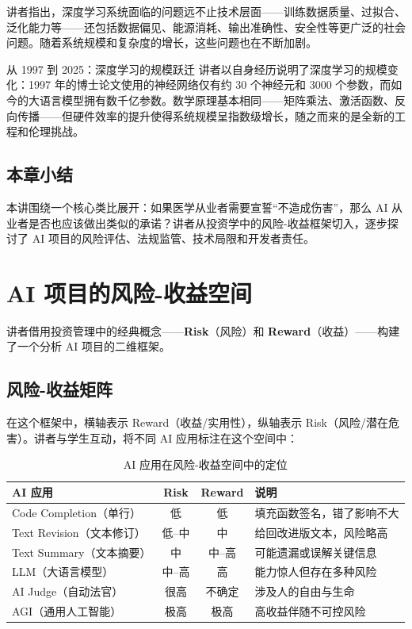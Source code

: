 \documentclass[a4paper]{article}
\begin{document}
讲者指出，深度学习系统面临的问题远不止技术层面——训练数据质量、过拟合、泛化能力等——还包括数据偏见、能源消耗、输出准确性、安全性等更广泛的社会问题。随着系统规模和复杂度的增长，这些问题也在不断加剧。

\begin{knowledgebox}{从 1997 到 2025：深度学习的规模跃迁}
讲者以自身经历说明了深度学习的规模变化：1997 年的博士论文使用的神经网络仅有约 30 个神经元和 3000 个参数，而如今的大语言模型拥有数千亿参数。数学原理基本相同——矩阵乘法、激活函数、反向传播——但硬件效率的提升使得系统规模呈指数级增长，随之而来的是全新的工程和伦理挑战。
\end{knowledgebox}

\subsection{本章小结}

本讲围绕一个核心类比展开：如果医学从业者需要宣誓``不造成伤害''，那么 AI 从业者是否也应该做出类似的承诺？讲者从投资学中的风险-收益框架切入，逐步探讨了 AI 项目的风险评估、法规监管、技术局限和开发者责任。

\section{AI 项目的风险-收益空间}

讲者借用投资管理中的经典概念——\textbf{Risk}（风险）和 \textbf{Reward}（收益）——构建了一个分析 AI 项目的二维框架。

\subsection{风险-收益矩阵}

在这个框架中，横轴表示 Reward（收益/实用性），纵轴表示 Risk（风险/潜在危害）。讲者与学生互动，将不同 AI 应用标注在这个空间中：

\begin{table}[H]
\centering
\caption{AI 应用在风险-收益空间中的定位}
\begin{tabular}{@{}lccl@{}}
\toprule
\textbf{AI 应用} & \textbf{Risk} & \textbf{Reward} & \textbf{说明} \\
\midrule
Code Completion（单行） & 低 & 低 & 填充函数签名，错了影响不大 \\
Text Revision（文本修订） & 低--中 & 中 & 给回改进版文本，风险略高 \\
Text Summary（文本摘要） & 中 & 中--高 & 可能遗漏或误解关键信息 \\
LLM（大语言模型） & 中--高 & 高 & 能力惊人但存在多种风险 \\
AI Judge（自动法官） & 很高 & 不确定 & 涉及人的自由与生命 \\
AGI（通用人工智能） & 极高 & 极高 & 高收益伴随不可控风险 \\
\bottomrule
\end{tabular}
\end{table}
\end{document}
